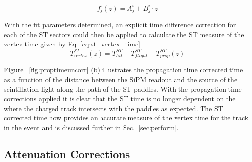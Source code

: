 	\begin{equation} \label{eq:pt_func_form}
		f^{i}_{j}(z) = A^{i}_{j} + B^{i}_{j} \cdot z
	\end{equation}
	
With the fit parameters determined, an explicit time difference correction for each of the ST sectors could then be applied to calculate the ST measure of the vertex time given by Eq. \ref{eq:st_vertex_time}.
	\begin{equation}\label{eq:st_vertex_time}
	 	T^{ST}_{vertex}(z) = T^{ST}_{hit} - T^{ST}_{flight} - T^{ST}_{prop}(z)
	\end{equation} 
	
Figure ~\ref{fig:proptimeuncorr} (b) illustrates the propagation time corrected time as a function of the distance between the SiPM readout and the source of the scintillation light along the path of the ST paddles.
With the propagation time corrections applied it is clear that the ST time is no longer dependent on the where the charged track intersects with the paddles as expected.  The ST corrected time now provides an accurate measure of the vertex time for the track in the event and is discussed further in Sec.~\ref{sec:perform}.

\subsection{Attenuation Corrections} \label{sec:calib_ac}

